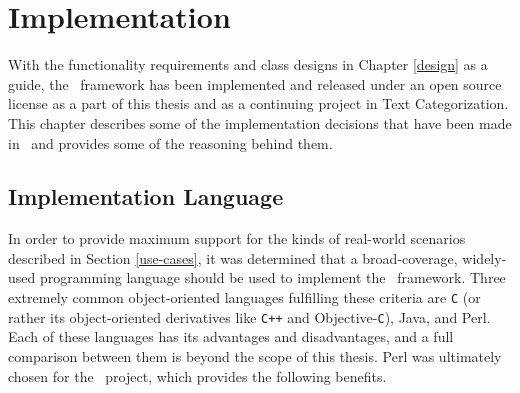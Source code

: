 \chapter{Implementation}
\label{Implementation}

With the functionality requirements and class designs in Chapter
\ref{design} as a guide, the \aicat\ framework has been implemented
and released under an open source license \cite{raymond:97,dibona:99} as a
part of this thesis and as a continuing project in Text
Categorization.  This chapter describes some of the implementation
decisions that have been made in \aicat\, and provides some of the
reasoning behind them.

\section{Implementation Language}
\label{imp-language}

In order to provide maximum support for the kinds of real-world
scenarios described in Section \ref{use-cases}, it was determined that
a broad-coverage, widely-used programming language should be used to
implement the \aicat\ framework.  Three extremely common
object-oriented languages fulfilling these criteria are \texttt{C} (or
rather its object-oriented derivatives like \texttt{C++} and
Objective-\texttt{C}), Java, and Perl.  Each of these languages has
its advantages and disadvantages, and a full comparison between them
is beyond the scope of this thesis.  Perl was ultimately chosen for
the \aicat\ project, which provides the following benefits.

